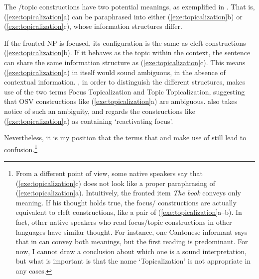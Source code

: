 The /topic  constructions have two potential meanings, as
exemplified in . That is,
(\ref{exe:topicalization}a) can be paraphrased into either
(\ref{exe:topicalization}b) or (\ref{exe:topicalization}c), whose
information structures differ.




\noindent If the fronted NP is focused, its configuration is the same
as cleft constructions (\ref{exe:topicalization}b). If it behaves as
the topic within the context, the sentence can share the same
information structure as (\ref{exe:topicalization}c).  This means
(\ref{exe:topicalization}a) in itself would sound ambiguous, in the
absence of contextual information.  \citet{gundel:83}, in order to
distinguish the different structures, makes use of the two terms Focus
Topicalization and Topic Topicalization, suggesting that OSV
constructions like (\ref{exe:topicalization}a) are
ambiguous. \citet{gussenhoven:07} also takes notice of such an
ambiguity, and regards the constructions like
(\ref{exe:topicalization}a) as containing `reactivating focus'.







\noindent Nevertheless, it is my position that the terms that
\citeauthor{gundel:83} and \citeauthor{gussenhoven:07} make use of
still lead to confusion.\footnote{From a different point of view, some
   native speakers say that (\ref{exe:topicalization}c)
  does not look like a proper paraphrasing of
  (\ref{exe:topicalization}a). Intuitively, the fronted
  item \textit{The book} conveys only  meaning.  If his
  thought holds true, the focus/ 
  constructions are actually equivalent to cleft constructions, like a
  pair of (\ref{exe:topicalization}a--b).  In fact, other native
  speakers who read focus/topic constructions in other languages have
  similar thought. For instance, one Cantonese informant says that
   in  can convey both
  meanings, but the first reading is predominant.  For now, I cannot
  draw a conclusion about which one is a sound interpretation, but
  what is important is that the name `Topicalization' is not
  appropriate in any cases.}


